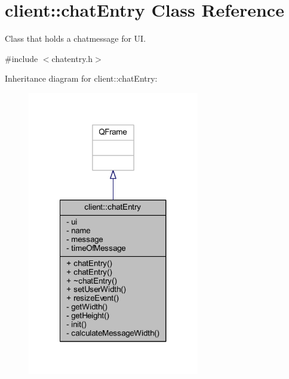 \hypertarget{classclient_1_1chat_entry}{\section{client\-:\-:chat\-Entry Class Reference}
\label{d5/dfb/classclient_1_1chat_entry}
}


Class that holds a chatmessage for U\-I.  




{\ttfamily \#include $<$chatentry.\-h$>$}



Inheritance diagram for client\-:\-:chat\-Entry\-:\nopagebreak
\begin{figure}[H]
\begin{center}
\leavevmode
\includegraphics[width=212pt]{d3/d73/classclient_1_1chat_entry__inherit__graph}
\end{center}
\end{figure}


